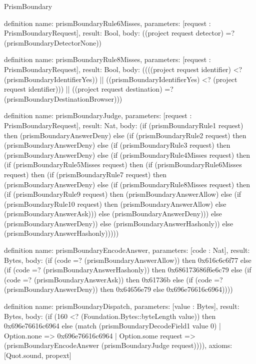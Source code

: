 \begin{lexlean}{PrismBoundary}
\begin{semanticmodule}
definition{
  name: prismBoundaryRule6Misses,
  parameters: [request : PrismBoundaryRequest],
  result: Bool,
  body: ((project request detector) =? (prismBoundaryDetectorNone))
}

definition{
  name: prismBoundaryRule8Misses,
  parameters: [request : PrismBoundaryRequest],
  result: Bool,
  body: ((((project request identifier) <? (prismBoundaryIdentifierYes)) || ((prismBoundaryIdentifierYes) <? (project request identifier))) || ((project request destination) =? (prismBoundaryDestinationBrowser)))
}

definition{
  name: prismBoundaryJudge,
  parameters: [request : PrismBoundaryRequest],
  result: Nat,
  body: (if (prismBoundaryRule1 request) then (prismBoundaryAnswerDeny) else (if (prismBoundaryRule2 request) then (prismBoundaryAnswerDeny) else (if (prismBoundaryRule3 request) then (prismBoundaryAnswerDeny) else (if (prismBoundaryRule4Misses request) then (if (prismBoundaryRule5Misses request) then (if (prismBoundaryRule6Misses request) then (if (prismBoundaryRule7 request) then (prismBoundaryAnswerDeny) else (if (prismBoundaryRule8Misses request) then (if (prismBoundaryRule9 request) then (prismBoundaryAnswerAllow) else (if (prismBoundaryRule10 request) then (prismBoundaryAnswerAllow) else (prismBoundaryAnswerAsk))) else (prismBoundaryAnswerDeny))) else (prismBoundaryAnswerDeny)) else (prismBoundaryAnswerHashonly)) else (prismBoundaryAnswerHashonly)))))
}

definition{
  name: prismBoundaryEncodeAnswer,
  parameters: [code : Nat],
  result: Bytes,
  body: (if (code =? (prismBoundaryAnswerAllow)) then 0x616c6c6f77 else (if (code =? (prismBoundaryAnswerHashonly)) then 0x686173686f6e6c79 else (if (code =? (prismBoundaryAnswerAsk)) then 0x61736b else (if (code =? (prismBoundaryAnswerDeny)) then 0x64656e79 else 0x696e76616c6964))))
}

definition{
  name: prismBoundaryDispatch,
  parameters: [value : Bytes],
  result: Bytes,
  body: (if (160 <? (Foundation.Bytes::byteLength value)) then 0x696e76616c6964 else (match (prismBoundaryDecodeField1 value 0)
    | Option.none => 0x696e76616c6964
    | Option.some request => (prismBoundaryEncodeAnswer (prismBoundaryJudge request)))),
  axioms: [Quot.sound, propext]
}
\end{semanticmodule}
\end{lexlean}

